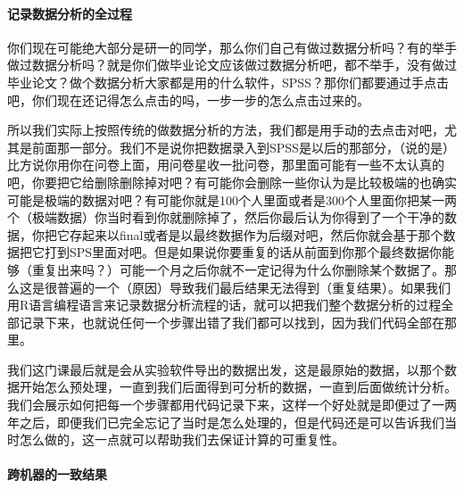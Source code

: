 \documentclass[
  oneside]{book}
\begin{document}
\hypertarget{ux8bb0ux5f55ux6570ux636eux5206ux6790ux7684ux5168ux8fc7ux7a0b}{%
\paragraph{\texorpdfstring{\textbf{记录数据分析的全过程}}{记录数据分析的全过程}}\label{ux8bb0ux5f55ux6570ux636eux5206ux6790ux7684ux5168ux8fc7ux7a0b}}

你们现在可能绝大部分是研一的同学，那么你们自己有做过数据分析吗？有的举手做过数据分析吗？就是你们做毕业论文应该做过数据分析吧，都不举手，没有做过毕业论文？做个数据分析大家都是用的什么软件，SPSS？那你们都要通过手点击吧，你们现在还记得怎么点击的吗，一步一步的怎么点击过来的。

所以我们实际上按照传统的做数据分析的方法，我们都是用手动的去点击对吧，尤其是前面那一部分。我们不是说你把数据录入到SPSS是以后的那部分，（说的是）比方说你用你在问卷上面，用问卷星收一批问卷，那里面可能有一些不太认真的吧，你要把它给删除删除掉对吧？有可能你会删除一些你认为是比较极端的也确实可能是极端的数据对吧？有可能你就是100个人里面或者是300个人里面你把某一两个（极端数据）你当时看到你就删除掉了，然后你最后认为你得到了一个干净的数据，你把它存起来以final或者是以最终数据作为后缀对吧，然后你就会基于那个数据把它打到SPS里面对吧。但是如果说你要重复的话从前面到你那个最终数据你能够（重复出来吗？）可能一个月之后你就不一定记得为什么你删除某个数据了。那么这是很普遍的一个（原因）导致我们最后结果无法得到（重复结果）。如果我们用R语言编程语言来记录数据分析流程的话，就可以把我们整个数据分析的过程全部记录下来，也就说任何一个步骤出错了我们都可以找到，因为我们代码全部在那里。

我们这门课最后就是会从实验软件导出的数据出发，这是最原始的数据，以那个数据开始怎么预处理，一直到我们后面得到可分析的数据，一直到后面做统计分析。我们会展示如何把每一个步骤都用代码记录下来，这样一个好处就是即便过了一两年之后，即便我们已完全忘记了当时是怎么处理的，但是代码还是可以告诉我们当时怎么做的，这一点就可以帮助我们去保证计算的可重复性。

\hypertarget{ux8de8ux673aux5668ux7684ux4e00ux81f4ux7ed3ux679c}{%
\paragraph{\texorpdfstring{\textbf{跨机器的一致结果}}{跨机器的一致结果}}\label{ux8de8ux673aux5668ux7684ux4e00ux81f4ux7ed3ux679c}}
\end{document}
